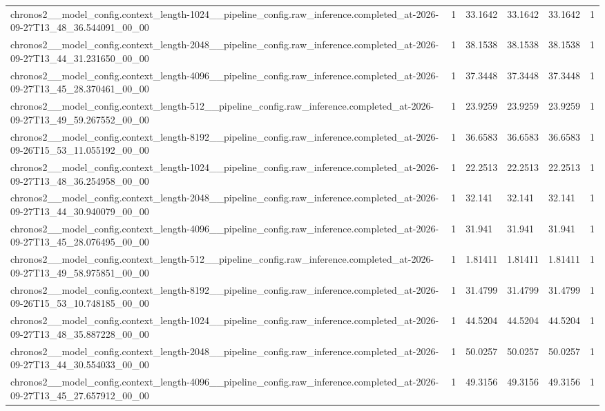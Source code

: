\begin{tabular}{llllll}
chronos2\_\_model\_config.context\_length-1024\_\_pipeline\_config.raw\_inference.completed\_at-2026-09-27T13\_48\_36.544091\_00\_00 & 1 & 33.1642 & 33.1642 & 33.1642 & 1 \\
chronos2\_\_model\_config.context\_length-2048\_\_pipeline\_config.raw\_inference.completed\_at-2026-09-27T13\_44\_31.231650\_00\_00 & 1 & 38.1538 & 38.1538 & 38.1538 & 1 \\
chronos2\_\_model\_config.context\_length-4096\_\_pipeline\_config.raw\_inference.completed\_at-2026-09-27T13\_45\_28.370461\_00\_00 & 1 & 37.3448 & 37.3448 & 37.3448 & 1 \\
chronos2\_\_model\_config.context\_length-512\_\_pipeline\_config.raw\_inference.completed\_at-2026-09-27T13\_49\_59.267552\_00\_00 & 1 & 23.9259 & 23.9259 & 23.9259 & 1 \\
chronos2\_\_model\_config.context\_length-8192\_\_pipeline\_config.raw\_inference.completed\_at-2026-09-26T15\_53\_11.055192\_00\_00 & 1 & 36.6583 & 36.6583 & 36.6583 & 1 \\
chronos2\_\_model\_config.context\_length-1024\_\_pipeline\_config.raw\_inference.completed\_at-2026-09-27T13\_48\_36.254958\_00\_00 & 1 & 22.2513 & 22.2513 & 22.2513 & 1 \\
chronos2\_\_model\_config.context\_length-2048\_\_pipeline\_config.raw\_inference.completed\_at-2026-09-27T13\_44\_30.940079\_00\_00 & 1 & 32.141 & 32.141 & 32.141 & 1 \\
chronos2\_\_model\_config.context\_length-4096\_\_pipeline\_config.raw\_inference.completed\_at-2026-09-27T13\_45\_28.076495\_00\_00 & 1 & 31.941 & 31.941 & 31.941 & 1 \\
chronos2\_\_model\_config.context\_length-512\_\_pipeline\_config.raw\_inference.completed\_at-2026-09-27T13\_49\_58.975851\_00\_00 & 1 & 1.81411 & 1.81411 & 1.81411 & 1 \\
chronos2\_\_model\_config.context\_length-8192\_\_pipeline\_config.raw\_inference.completed\_at-2026-09-26T15\_53\_10.748185\_00\_00 & 1 & 31.4799 & 31.4799 & 31.4799 & 1 \\
chronos2\_\_model\_config.context\_length-1024\_\_pipeline\_config.raw\_inference.completed\_at-2026-09-27T13\_48\_35.887228\_00\_00 & 1 & 44.5204 & 44.5204 & 44.5204 & 1 \\
chronos2\_\_model\_config.context\_length-2048\_\_pipeline\_config.raw\_inference.completed\_at-2026-09-27T13\_44\_30.554033\_00\_00 & 1 & 50.0257 & 50.0257 & 50.0257 & 1 \\
chronos2\_\_model\_config.context\_length-4096\_\_pipeline\_config.raw\_inference.completed\_at-2026-09-27T13\_45\_27.657912\_00\_00 & 1 & 49.3156 & 49.3156 & 49.3156 & 1 \\

\end{tabular}
